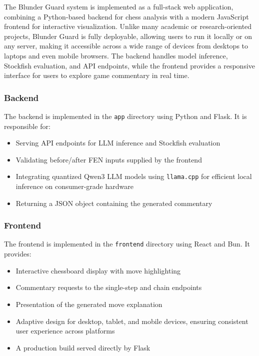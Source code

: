 \documentclass[sigconf,nonacm]{acmart}
\begin{document}
The Blunder Guard system is implemented as a full-stack web application, combining a Python-based backend for chess analysis with a modern JavaScript frontend for interactive visualization. Unlike many academic or research-oriented projects, Blunder Guard is fully deployable, allowing users to run it locally or on any server, making it accessible across a wide range of devices from desktops to laptops and even mobile browsers. The backend handles model inference, Stockfish evaluation, and API endpoints, while the frontend provides a responsive interface for users to explore game commentary in real time.

\subsubsection{Backend}

The backend is implemented in the \texttt{app} directory using Python and Flask. It is responsible for:

\begin{itemize}
\item Serving API endpoints for LLM inference and Stockfish evaluation
\item Validating before/after FEN inputs supplied by the frontend
\item Integrating quantized Qwen3 LLM models using \texttt{llama.cpp} for efficient local inference on consumer-grade hardware
\item Returning a JSON object containing the generated commentary
\end{itemize}

\subsubsection{Frontend}

The frontend is implemented in the \texttt{frontend} directory using React and Bun. It provides:

\begin{itemize}
\item Interactive chessboard display with move highlighting
\item Commentary requests to the single-step and chain endpoints
\item Presentation of the generated move explanation
\item Adaptive design for desktop, tablet, and mobile devices, ensuring consistent user experience across platforms
\item A production build served directly by Flask
\end{itemize}
\end{document}
